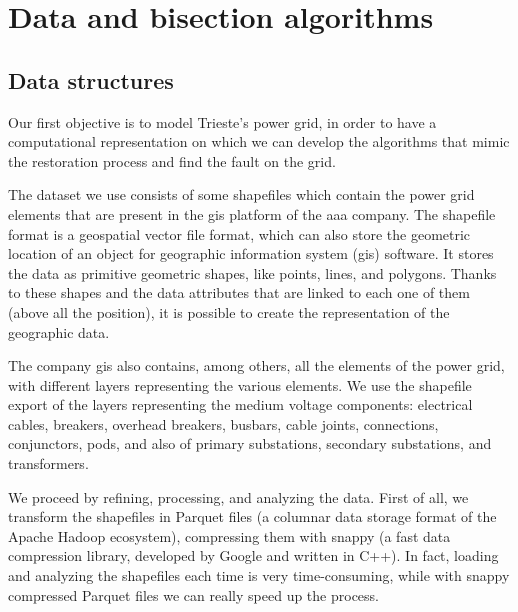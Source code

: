 \chapter{Data and bisection algorithms}


\section{Data structures}

Our first objective is to model Trieste's power grid, in order to have a computational representation on which we can develop the algorithms that mimic the restoration process and find the fault on the grid.

The dataset we use consists of some shapefiles which contain the power grid elements that are present in the \acrshort{gis} platform of the \acrshort{aaa} company. The shapefile format is a geospatial vector file format, which can also store the geometric location of an object for geographic information system (\acrshort{gis}) software. It stores the data as primitive geometric shapes, like points, lines, and polygons. Thanks to these shapes and the data attributes that are linked to each one of them (above all the position), it is possible to create the representation of the geographic data.

The company \acrshort{gis} also contains, among others, all the elements of the power grid, with different layers representing the various elements. We use the shapefile export of the layers representing the medium voltage components: electrical cables, breakers, overhead breakers, busbars, cable joints, connections, conjunctors, \acrshort{pod}s, and also of primary substations, secondary substations, and transformers.



We proceed by refining, processing, and analyzing the data. First of all, we transform the shapefiles in Parquet files (a columnar data storage format of the Apache Hadoop ecosystem), compressing them with snappy (a fast data compression library, developed by Google and written in C++). In fact, loading and analyzing the shapefiles each time is very time-consuming, while with snappy compressed Parquet files we can really speed up the process.

